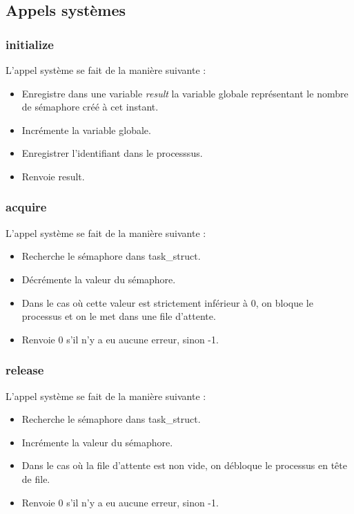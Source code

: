 \documentclass[12pt]{article}
\begin{document}
    \subsection{Appels systèmes}
      \subsubsection{initialize}
        L'appel système se fait de la manière suivante :
        \begin{itemize}
          \item Enregistre dans une variable \textit{result} la variable globale représentant le nombre de sémaphore créé à cet instant.
          \item Incrémente la variable globale.
          \item Enregistrer l'identifiant dans le processsus.
          \item Renvoie result.
        \end{itemize}
      \subsubsection{acquire}
        L'appel système se fait de la manière suivante :
          \begin{itemize}
            \item Recherche le sémaphore dans task\_struct.
            \item Décrémente la valeur du sémaphore.
            \item Dans le cas où cette valeur est strictement inférieur à 0, on bloque le processus et on le met dans une file d'attente.
            \item Renvoie 0 s'il n'y a eu aucune erreur, sinon -1.
          \end{itemize}
      \subsubsection{release}
        L'appel système se fait de la manière suivante :
          \begin{itemize}
            \item Recherche le sémaphore dans task\_struct.
            \item Incrémente la valeur du sémaphore.
            \item Dans le cas où la file d'attente est non vide, on débloque le processus en tête de file.
            \item Renvoie 0 s'il n'y a eu aucune erreur, sinon -1.
          \end{itemize}
\end{document}
